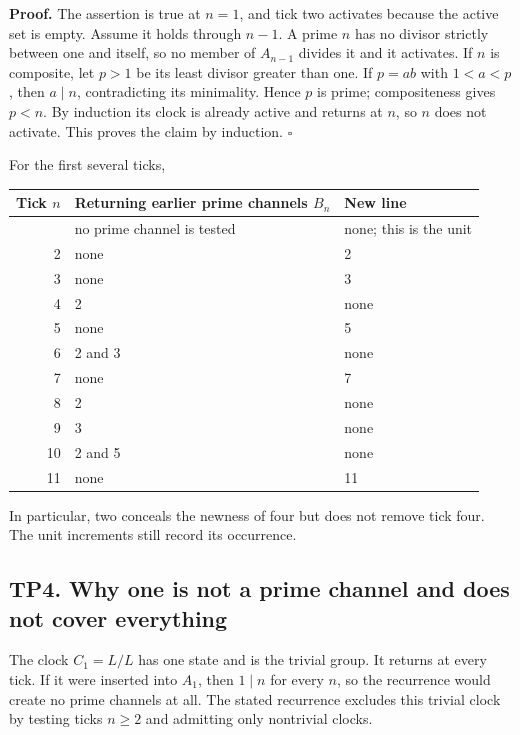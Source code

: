 \documentclass[
]{article}
\newcounter{none} %
\begin{document}
\textbf{Proof.} The assertion is true at \(n=1\), and tick two activates
because the active set is empty. Assume it holds through \(n-1\). A
prime \(n\) has no divisor strictly between one and itself, so no member
of \(A_{n-1}\) divides it and it activates. If \(n\) is composite, let
\(p>1\) be its least divisor greater than one. If \(p=ab\) with
\(1<a<p\), then \(a\mid n\), contradicting its minimality. Hence \(p\)
is prime; compositeness gives \(p<n\). By induction its clock is already
active and returns at \(n\), so \(n\) does not activate. This proves the
claim by induction. \(\square\)

For the first several ticks,

{\def\LTcaptype{none} %
\begin{longtable}[]{@{}rll@{}}
\toprule\noalign{}
Tick \(n\) & Returning earlier prime channels \(B_n\) & New line \\
\midrule\noalign{}
\endhead
\bottomrule\noalign{}
\endlastfoot
1 & no prime channel is tested & none; this is the unit \\
2 & none & 2 \\
3 & none & 3 \\
4 & 2 & none \\
5 & none & 5 \\
6 & 2 and 3 & none \\
7 & none & 7 \\
8 & 2 & none \\
9 & 3 & none \\
10 & 2 and 5 & none \\
11 & none & 11 \\
\end{longtable}
}

In particular, two conceals the newness of four but does not remove tick
four. The unit increments still record its occurrence.

\subsection{TP4. Why one is not a prime channel and does not cover
everything}\label{tp4.-why-one-is-not-a-prime-channel-and-does-not-cover-everything}

The clock \(C_1=L/L\) has one state and is the trivial group. It returns
at every tick. If it were inserted into \(A_1\), then \(1\mid n\) for
every \(n\), so the recurrence would create no prime channels at all.
The stated recurrence excludes this trivial clock by testing ticks
\(n\ge2\) and admitting only nontrivial clocks.
\end{document}
